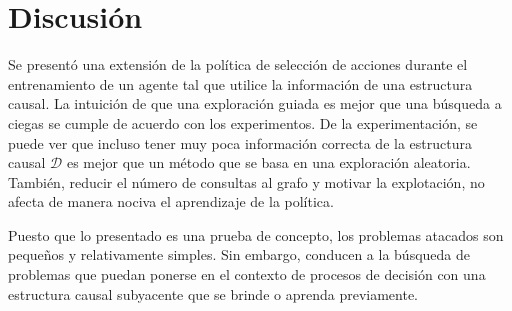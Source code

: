 \newpage
\section{Discusión}

Se presentó una extensión de la política de selección
de acciones durante el entrenamiento de un agente tal que utilice la información de una estructura causal. La intuición de que una exploración
guiada es mejor que una búsqueda a ciegas se cumple de acuerdo 
con los experimentos. De la experimentación, se puede ver que incluso tener muy poca información correcta de la estructura causal $\mathcal{D}$ es mejor que
un método que se basa en una exploración aleatoria. También, reducir el número 
de consultas al grafo y motivar la explotación, no afecta de manera nociva el
aprendizaje de la política.

Puesto que lo presentado es una prueba de concepto, los problemas atacados
son pequeños y relativamente simples. Sin embargo, conducen a la búsqueda
de problemas que puedan ponerse en el contexto de procesos de decisión
con una estructura causal subyacente que se brinde o aprenda previamente.





